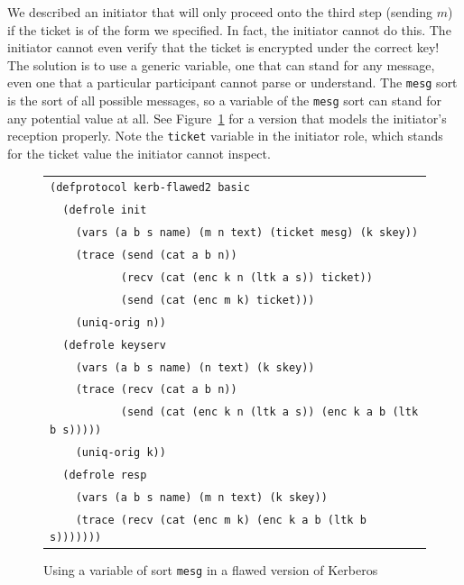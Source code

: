 We described an initiator that will only proceed onto the third step
(sending $m$) if the ticket is of the form we specified.  In fact, the
initiator cannot do this.  The initiator cannot even verify that the
ticket is encrypted under the correct key! The solution is to use a
generic variable, one that can stand for any message, even one that a
particular participant cannot parse or understand.  The \texttt{mesg}
sort is the sort of all possible messages, so a variable of the
\texttt{mesg} sort can stand for any potential value at all.  See
Figure~\ref{fig:kerb-flawed2 defprotocol} for a version that models
the initiator's reception properly.  Note the \texttt{ticket} variable
in the initiator role, which stands for the ticket value the initiator
cannot inspect.

\begin{figure}
\begin{center}
\begin{tabular}{l}
\verb|(defprotocol kerb-flawed2 basic|\\
\verb|  (defrole init|\\
\verb|    (vars (a b s name) (m n text) (ticket mesg) (k skey))|\\
\verb|    (trace (send (cat a b n))|\\
\verb|           (recv (cat (enc k n (ltk a s)) ticket))|\\
\verb|           (send (cat (enc m k) ticket)))|\\
\verb|    (uniq-orig n))|\\
\verb|  (defrole keyserv|\\
\verb|    (vars (a b s name) (n text) (k skey))|\\
\verb|    (trace (recv (cat a b n))|\\
\verb|           (send (cat (enc k n (ltk a s)) (enc k a b (ltk b s)))))|\\
\verb|    (uniq-orig k))|\\
\verb|  (defrole resp|\\
\verb|    (vars (a b s name) (m n text) (k skey))|\\
\verb|    (trace (recv (cat (enc m k) (enc k a b (ltk b s)))))))|\\
\end{tabular}
\end{center}
\caption[Flawed Kerberos with a generic ticket]{Using a variable of
  sort \texttt{mesg} in a flawed version of Kerberos}
\label{fig:kerb-flawed2 defprotocol}
\end{figure}


